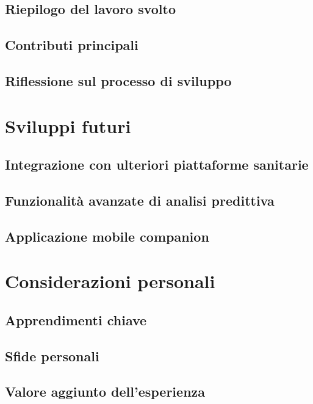 \documentclass[12pt,a4paper,oneside]{report}
\begin{document}
\subsection{Riepilogo del lavoro svolto}

\subsection{Contributi principali}

\subsection{Riflessione sul processo di sviluppo}

\section{Sviluppi futuri}
\subsection{Integrazione con ulteriori piattaforme sanitarie}

\subsection{Funzionalità avanzate di analisi predittiva}

\subsection{Applicazione mobile companion}

\section{Considerazioni personali}
\subsection{Apprendimenti chiave}

\subsection{Sfide personali}

\subsection{Valore aggiunto dell'esperienza}

\appendix
\end{document}
